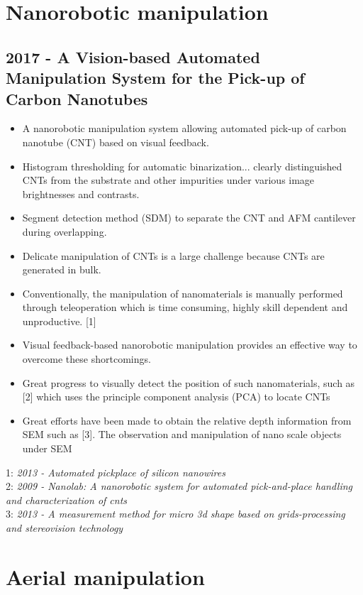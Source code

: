 \vspace{3cm}

\section{Nanorobotic manipulation}
\subsection{2017 - A Vision-based Automated Manipulation System for the Pick-up of Carbon Nanotubes}
\begin{itemize}
\item A nanorobotic manipulation system allowing automated pick-up of carbon nanotube (CNT) based on visual feedback.
\item Histogram thresholding for automatic binarization... clearly distinguished CNTs from the substrate and other impurities under various image brightnesses and contrasts.
\item Segment detection method (SDM) to separate the CNT
and AFM cantilever during overlapping.
\item Delicate manipulation of CNTs is a large challenge because CNTs are generated in bulk.
\item Conventionally, the manipulation of nanomaterials is manually performed through teleoperation which is time consuming, highly skill dependent and unproductive. [1]
\item Visual feedback-based nanorobotic manipulation
provides an effective way to overcome these shortcomings. 
\item Great progress to visually detect the position
of such nanomaterials, such as [2] which uses the principle component analysis (PCA) to locate CNTs
\item Great efforts have been made to obtain the relative depth information from SEM such as [3]. The observation and manipulation of nano scale objects under SEM
\end{itemize}
1: \textit{2013 - Automated pickplace of silicon nanowires} \\
2: \textit{2009 - Nanolab: A nanorobotic system for automated pick-and-place handling and characterization of cnts} \\
3: \textit{2013 - A measurement method for micro 3d shape
based on grids-processing and stereovision technology}

\vspace{3cm}

\section{Aerial manipulation}
